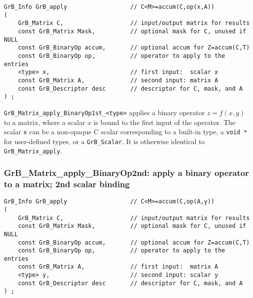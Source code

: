 \documentclass[12pt]{article}
\begin{document}
\begin{mdframed}[userdefinedwidth=6in]
{\footnotesize
\begin{verbatim}
GrB_Info GrB_apply                  // C<M>=accum(C,op(x,A))
(
    GrB_Matrix C,                   // input/output matrix for results
    const GrB_Matrix Mask,          // optional mask for C, unused if NULL
    const GrB_BinaryOp accum,       // optional accum for Z=accum(C,T)
    const GrB_BinaryOp op,          // operator to apply to the entries
    <type> x,                       // first input:  scalar x
    const GrB_Matrix A,             // second input: matrix A
    const GrB_Descriptor desc       // descriptor for C, mask, and A
) ;
\end{verbatim} } \end{mdframed}

\verb'GrB_Matrix_apply_BinaryOp1st_<type>'  applies a binary operator
$z=f(x,y)$ to a matrix, where a scalar $x$ is bound to the first input of the
operator. 
The scalar \verb'x' can be a non-opaque C scalar corresponding to a built-in
type, a \verb'void *' for user-defined types, or a \verb'GrB_Scalar'.
It is otherwise identical to \verb'GrB_Matrix_apply'.

\newpage
\subsubsection{{\sf GrB\_Matrix\_apply\_BinaryOp2nd:} apply a binary operator to a matrix; 2nd scalar binding}
\label{matrix_apply2nd}

\begin{mdframed}[userdefinedwidth=6in]
{\footnotesize
\begin{verbatim}
GrB_Info GrB_apply                  // C<M>=accum(C,op(A,y))
(
    GrB_Matrix C,                   // input/output matrix for results
    const GrB_Matrix Mask,          // optional mask for C, unused if NULL
    const GrB_BinaryOp accum,       // optional accum for Z=accum(C,T)
    const GrB_BinaryOp op,          // operator to apply to the entries
    const GrB_Matrix A,             // first input:  matrix A
    <type> y,                       // second input: scalar y
    const GrB_Descriptor desc       // descriptor for C, mask, and A
) ;
\end{verbatim} } \end{mdframed}
\end{document}

